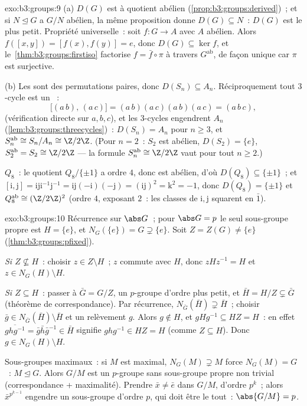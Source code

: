 \begin{solution}{exo:b3:groups:9}
(a) $D(G)$ est  à quotient abélien
(\cref{prop:b3:groups:derived})~; et si $N \trianglelefteq G$ a
$G/N$ abélien, la même proposition donne $D(G) \subseteq N$~:
$D(G)$ est le plus petit. Propriété universelle~: soit $f \colon
G \to A$ avec $A$ abélien. Alors $f([x,y]) = [f(x), f(y)] = e$,
donc $D(G) \subseteq \ker f$, et le~\cref{thm:b3:groups:firstiso}
factorise $f = \bar f \circ \pi$ à travers $G^{\mathrm{ab}}$, de
façon unique car $\pi$ est surjective.

(b) Les  sont des permutations paires, donc $D(S_n)
\subseteq A_n$. Réciproquement tout $3$-cycle est un
~:
\[
\bigl[(a\,b),\,(a\,c)\bigr] = (a\,b)(a\,c)(a\,b)(a\,c) =
(a\,b\,c),
\]
(vérification directe sur $a, b, c$), et les $3$-cycles engendrent
$A_n$ (\cref{lem:b3:groups:threecycles})~: $D(S_n) = A_n$ pour $n
\geq 3$, et $S_n^{\mathrm{ab}} \cong S_n/A_n \cong \Z/2\Z$.
(Pour $n = 2$~: $S_2$ est abélien, $D(S_2) = \{e\}$,
$S_2^{\mathrm{ab}} = S_2 \cong \Z/2\Z$ --- la formule
$S_n^{\mathrm{ab}} \cong \Z/2\Z$ vaut pour tout $n \geq 2$.)

$Q_8$~: le quotient $Q_8/\{\pm 1\}$ a ordre $4$, donc est
abélien, d'où $D(Q_8) \subseteq \{\pm 1\}$~; et $[\mathrm i,
\mathrm j] = \mathrm i \mathrm j \mathrm i^{-1}\mathrm j^{-1} =
\mathrm i\mathrm j(-\mathrm i)(-\mathrm j) = (\mathrm i \mathrm
j)^2 = \mathrm k^2 = -1$, donc $D(Q_8) = \{\pm 1\}$ et
$Q_8^{\mathrm{ab}} \cong (\Z/2\Z)^2$ (ordre $4$, exposant $2$~:
les classes de $\mathrm i, \mathrm j$ squarent en $\bar 1$).
\end{solution}

\begin{solution}{exo:b3:groups:10}
Récurrence sur $\abs G$~; pour $\abs G = p$ le seul sous-groupe
propre est $H = \{e\}$, et $N_G(\{e\}) = G \supsetneq \{e\}$.
Soit $Z = Z(G) \neq \{e\}$ (\cref{thm:b3:groups:pfixed}).

\emph{Si $Z \not\subseteq H$}~: choisir $z \in Z \setminus H$~;
$z$ commute avec $H$, donc $zHz^{-1} = H$ et $z \in N_G(H)
\setminus H$.

\emph{Si $Z \subseteq H$}~: passer à $\bar G = G/Z$, un
$p$-groupe d'ordre plus petit, et $\bar H = H/Z \subsetneq \bar
G$ (théorème de correspondance). Par récurrence,
$N_{\bar G}(\bar H) \supsetneq \bar H$~; choisir $\bar g \in
N_{\bar G}(\bar H) \setminus \bar H$ et un relèvement $g$. Alors
$g \notin H$, et $gHg^{-1} \subseteq HZ = H$~: en effet
$\overline{ghg^{-1}} = \bar g \bar h \bar g^{-1} \in \bar H$
signifie $ghg^{-1} \in HZ = H$ (comme $Z \subseteq H$). Donc $g
\in N_G(H)\setminus H$.

Sous-groupes maximaux~: si $M$ est maximal, $N_G(M) \supsetneq M$
force $N_G(M) = G$~: $M \trianglelefteq G$. Alors $G/M$ est un
$p$-groupe sans sous-groupe propre non trivial (correspondance +
maximalité). Prendre $\bar x \neq \bar e$ dans $G/M$, d'ordre
$p^k$~; alors $\bar x^{p^{k-1}}$ engendre un sous-groupe d'ordre
$p$, qui doit être le tout~: $\abs{G/M} = p$.
\end{solution}

